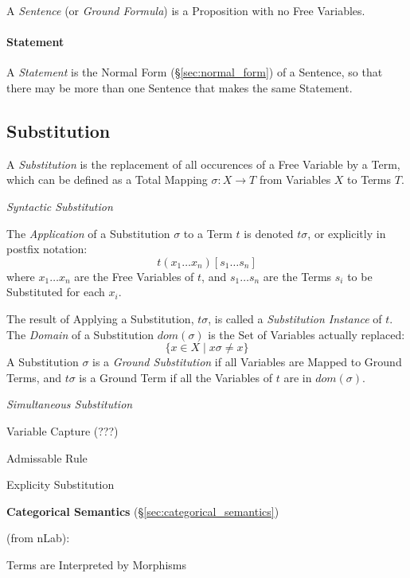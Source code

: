 A \emph{Sentence} (or \emph{Ground Formula}) is a Proposition with no
Free Variables.



\paragraph{Statement}\label{sec:statement}

A \emph{Statement} is the Normal Form (\S\ref{sec:normal_form}) of a
Sentence, so that there may be more than one Sentence that makes the
same Statement.



\subsection{Substitution}\label{sec:substitution}

A \emph{Substitution} is the replacement of all occurences of a Free
Variable by a Term, which can be defined as a Total Mapping $\sigma: X
\rightarrow T$ from Variables $X$ to Terms $T$.

\emph{Syntactic Substitution}

The \emph{Application} of a Substitution $\sigma$ to a Term $t$ is
denoted $t\sigma$, or explicitly in postfix notation:
\[
  t(x_1 \ldots x_n)[s_1 \ldots s_n]
\]
where $x_1 \ldots x_n$ are the Free Variables of $t$, and $s_1 \ldots
s_n$ are the Terms $s_i$ to be Substituted for each $x_i$.

The result of Applying a Substitution, $t\sigma$, is called a
\emph{Substitution Instance} of $t$. The \emph{Domain} of a
Substitution $dom(\sigma)$ is the Set of Variables actually replaced:
\[
  \{ x \in X \;|\; x\sigma \neq x \}
\]
A Substitution $\sigma$ is a \emph{Ground Substitution} if all
Variables are Mapped to Ground Terms, and $t\sigma$ is a Ground Term
if all the Variables of $t$ are in $dom(\sigma)$.

\emph{Simultaneous Substitution}

Variable Capture (???)

Admissable Rule

Explicity Substitution


\textbf{Categorical Semantics} (\S\ref{sec:categorical_semantics})

(from nLab): %

Terms are Interpreted by Morphisms

